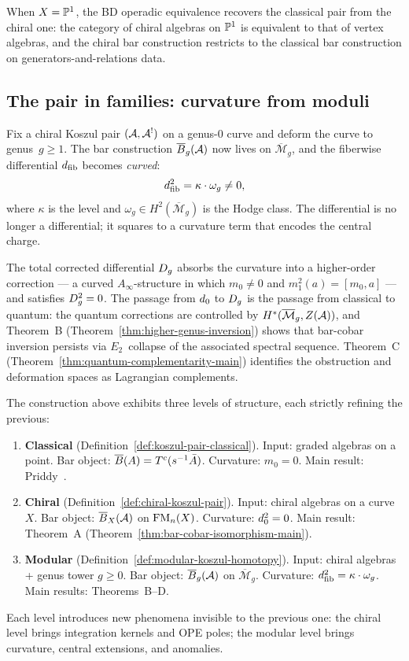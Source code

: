 When $X = \mathbb{P}^1$, the BD operadic equivalence recovers the classical pair from the chiral one: the category of chiral algebras on $\mathbb{P}^1$ is equivalent to that of vertex algebras, and the chiral bar construction restricts to the classical bar construction on generators-and-relations data.

\subsection{The pair in families: curvature from moduli}

Fix a chiral Koszul pair $(\mathcal{A}, \mathcal{A}^!)$ on a genus-$0$ curve and deform the curve to genus~$g \geq 1$.  The bar construction
$\overline{B}_g(\mathcal{A})$ now lives on $\overline{\mathcal{M}}_g$, and the
fiberwise differential $d_{\mathrm{fib}}$ becomes \emph{curved}:
\[
  d_{\mathrm{fib}}^2 = \kappa \cdot \omega_g \neq 0,
\]
where $\kappa$ is the level and $\omega_g \in H^2(\overline{\mathcal{M}}_g)$
is the Hodge class.  The differential is no longer a differential; it squares to a curvature term that encodes the central charge.

The total corrected differential $D_{g}$ absorbs the curvature into a higher-order correction --- a curved $A_\infty$-structure in which $m_0 \neq 0$ and $m_1^2(a) = [m_0, a]$ --- and satisfies $D_{g}^2 = 0$.  The passage from $d_0$ to $D_{g}$ is the passage from classical to quantum: the quantum corrections are controlled by $H^*(\overline{\mathcal{M}}_g, Z(\mathcal{A}))$, and Theorem~B (Theorem~\ref{thm:higher-genus-inversion}) shows that bar-cobar inversion persists via $E_2$~collapse of the associated spectral sequence.  Theorem~C (Theorem~\ref{thm:quantum-complementarity-main}) identifies the obstruction and deformation spaces as Lagrangian complements.

\begin{remark}\label{rem:three-koszul-levels}
The construction above exhibits three levels of structure, each
strictly refining the previous:
\begin{enumerate}[leftmargin=2em]
\item \textbf{Classical} (Definition~\ref{def:koszul-pair-classical}).
  Input: graded algebras on a point.  Bar object: $\overline{B}(A) = T^c(s^{-1}\bar{A})$.
  Curvature: $m_0 = 0$.  Main result: Priddy~\cite{Priddy70}.
\item \textbf{Chiral} (Definition~\ref{def:chiral-koszul-pair}).
  Input: chiral algebras on a curve~$X$.  Bar object: $\overline{B}_X(\mathcal{A})$
  on $\mathrm{FM}_n(X)$.  Curvature: $d_0^2 = 0$.  Main result: Theorem~A
  (Theorem~\ref{thm:bar-cobar-isomorphism-main}).
\item \textbf{Modular} (Definition~\ref{def:modular-koszul-homotopy}).
  Input: chiral algebras + genus tower $g \geq 0$.  Bar object:
  $\overline{B}_g(\mathcal{A})$ on $\overline{\mathcal{M}}_g$.  Curvature:
  $d_{\mathrm{fib}}^2 = \kappa \cdot \omega_g$.  Main results: Theorems~B--D.
\end{enumerate}
Each level introduces new phenomena invisible to the previous one:
the chiral level brings integration kernels and OPE poles; the
modular level brings curvature, central extensions, and anomalies.
\end{remark}

